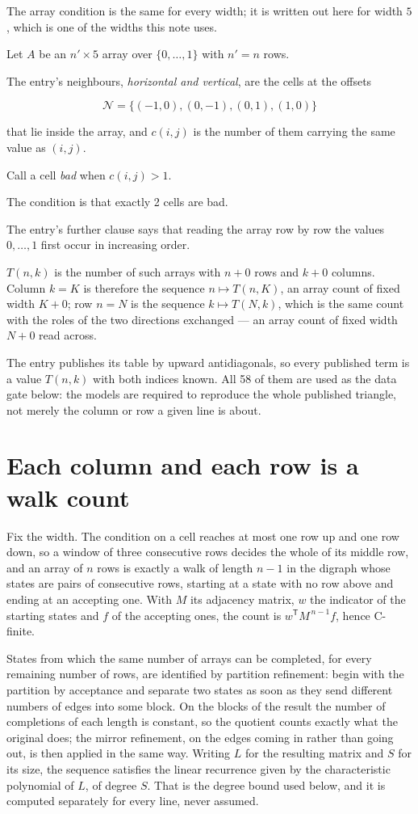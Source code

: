 \documentclass[11pt]{article}
\theoremstyle{definition}
\begin{document}
The array condition is the same for every width; it is written out here for width $5$, which is one of the widths this note uses.

Let $A$ be an $n' \times 5$ array over $\{0,\dots,1\}$ with $n' = n$ rows.

The entry's neighbours, {\itshape horizontal and vertical}, are the cells at the offsets

\[\mathcal{N} = \{(-1,0), (0,-1), (0,1), (1,0)\}\]

that lie inside the array, and $c(i,j)$ is the number of them carrying the same value as $(i,j)$.

Call a cell {\itshape bad} when $c(i,j) > 1$.

The condition is that exactly 2 cells are bad.

The entry's further clause says that reading the array row by row the values $0,\dots,1$ first occur in increasing order.

$T(n,k)$ is the number of such arrays with $n + 0$ rows and $k + 0$ columns. Column $k = K$ is therefore the sequence $n \mapsto T(n,K)$, an array count of fixed width $K + 0$; row $n = N$ is the sequence $k \mapsto T(N,k)$, which is the same count with the roles of the two directions exchanged --- an array count of fixed width $N + 0$ read across.

The entry publishes its table by upward antidiagonals, so every published term is a value $T(n,k)$ with both indices known. All 58 of them are used as the data gate below: the models are required to reproduce the whole published triangle, not merely the column or row a given line is about.

\section{Each column and each row is a walk count}

Fix the width. The condition on a cell reaches at most one row up and one row down, so a window of three consecutive rows decides the whole of its middle row, and an array of $n$ rows is exactly a walk of length $n-1$ in the digraph whose states are pairs of consecutive rows, starting at a state with no row above and ending at an accepting one. With $M$ its adjacency matrix, $w$ the indicator of the starting states and $f$ of the accepting ones, the count is $w^{\mathsf T}M^{\,n-1}f$, hence C-finite.

States from which the same number of arrays can be completed, for every remaining number of rows, are identified by partition refinement: begin with the partition by acceptance and separate two states as soon as they send different numbers of edges into some block. On the blocks of the result the number of completions of each length is constant, so the quotient counts exactly what the original does; the mirror refinement, on the edges coming in rather than going out, is then applied in the same way. Writing $L$ for the resulting matrix and $S$ for its size, the sequence satisfies the linear recurrence given by the characteristic polynomial of $L$, of degree $S$. That is the degree bound used below, and it is computed separately for every line, never assumed.
\end{document}
